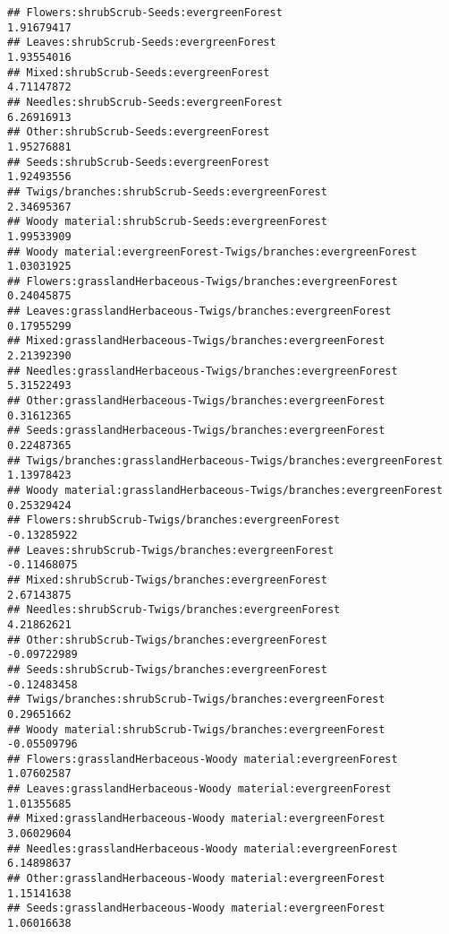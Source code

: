 \documentclass[
]{article}
\begin{document}
\begin{verbatim}
## Flowers:shrubScrub-Seeds:evergreenForest                               1.91679417
## Leaves:shrubScrub-Seeds:evergreenForest                                1.93554016
## Mixed:shrubScrub-Seeds:evergreenForest                                 4.71147872
## Needles:shrubScrub-Seeds:evergreenForest                               6.26916913
## Other:shrubScrub-Seeds:evergreenForest                                 1.95276881
## Seeds:shrubScrub-Seeds:evergreenForest                                 1.92493556
## Twigs/branches:shrubScrub-Seeds:evergreenForest                        2.34695367
## Woody material:shrubScrub-Seeds:evergreenForest                        1.99533909
## Woody material:evergreenForest-Twigs/branches:evergreenForest          1.03031925
## Flowers:grasslandHerbaceous-Twigs/branches:evergreenForest             0.24045875
## Leaves:grasslandHerbaceous-Twigs/branches:evergreenForest              0.17955299
## Mixed:grasslandHerbaceous-Twigs/branches:evergreenForest               2.21392390
## Needles:grasslandHerbaceous-Twigs/branches:evergreenForest             5.31522493
## Other:grasslandHerbaceous-Twigs/branches:evergreenForest               0.31612365
## Seeds:grasslandHerbaceous-Twigs/branches:evergreenForest               0.22487365
## Twigs/branches:grasslandHerbaceous-Twigs/branches:evergreenForest      1.13978423
## Woody material:grasslandHerbaceous-Twigs/branches:evergreenForest      0.25329424
## Flowers:shrubScrub-Twigs/branches:evergreenForest                     -0.13285922
## Leaves:shrubScrub-Twigs/branches:evergreenForest                      -0.11468075
## Mixed:shrubScrub-Twigs/branches:evergreenForest                        2.67143875
## Needles:shrubScrub-Twigs/branches:evergreenForest                      4.21862621
## Other:shrubScrub-Twigs/branches:evergreenForest                       -0.09722989
## Seeds:shrubScrub-Twigs/branches:evergreenForest                       -0.12483458
## Twigs/branches:shrubScrub-Twigs/branches:evergreenForest               0.29651662
## Woody material:shrubScrub-Twigs/branches:evergreenForest              -0.05509796
## Flowers:grasslandHerbaceous-Woody material:evergreenForest             1.07602587
## Leaves:grasslandHerbaceous-Woody material:evergreenForest              1.01355685
## Mixed:grasslandHerbaceous-Woody material:evergreenForest               3.06029604
## Needles:grasslandHerbaceous-Woody material:evergreenForest             6.14898637
## Other:grasslandHerbaceous-Woody material:evergreenForest               1.15141638
## Seeds:grasslandHerbaceous-Woody material:evergreenForest               1.06016638

\end{verbatim}
\end{document}
